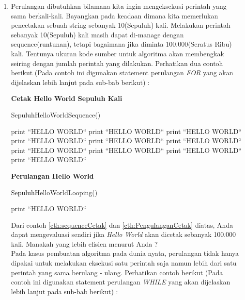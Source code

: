 \begin{enumerate}
	\item Perulangan dibutuhkan bilamana kita ingin mengeksekusi perintah yang sama berkali-kali. Bayangkan pada keadaan dimana kita memerlukan pencetakan sebuah string sebanyak 10(Sepuluh) kali. Melakukan perintah sebanyak 10(Sepuluh) kali masih dapat di-manage dengan sequence(runtunan), tetapi bagaimana jika diminta 100.000(Seratus Ribu) kali. Tentunya ukuran kode sumber untuk algoritma akan membengkak seiring dengan jumlah perintah yang dilakukan. Perhatikan dua contoh berikut (Pada contoh ini digunakan statement perulangan \textit{FOR} yang akan dijelaskan lebih lanjut pada sub-bab berikut) :
	
\begin{contoh}
	\label{cth:sequenceCetak}
	\textbf{Cetak Hello World Sepuluh Kali}
	\begin{algorithm}
	\caption{SepuluhHelloWorldSequence()}
		\begin{algorithmic}[1]
			\STATE print ``HELLO WORLD``
			\STATE print ``HELLO WORLD``
			\STATE print ``HELLO WORLD``
			\STATE print ``HELLO WORLD``
			\STATE print ``HELLO WORLD``
			\STATE print ``HELLO WORLD``
			\STATE print ``HELLO WORLD``
			\STATE print ``HELLO WORLD``
			\STATE print ``HELLO WORLD``
			\STATE print ``HELLO WORLD``
		\end{algorithmic}
	\end{algorithm}
\end{contoh}

\begin{contoh}
	\label{cth:PengulanganCetak}
	\textbf{Perulangan Hello World}
	\begin{algorithm}
	\caption{SepuluhHelloWorldLooping()}
		\begin{algorithmic}[1]
		\FOR{$i=1$ \TO $10$}
			\STATE print ``HELLO WORLD``
		\ENDFOR
		\end{algorithmic}
	\end{algorithm}
\end{contoh}

Dari contoh \ref{cth:sequenceCetak} dan \ref{cth:PengulanganCetak} diatas, Anda dapat mengevaluasi sendiri jika \textit{Hello World} akan dicetak sebanyak 100.000 kali. Manakah yang lebih efisien menurut Anda ? \\
Pada kasus pembuatan algoritma pada dunia nyata, perulangan tidak hanya dipakai untuk melakukan eksekusi satu perintah saja namun lebih dari satu perintah yang sama berulang - ulang. Perhatikan contoh berikut (Pada contoh ini digunakan statement perulangan \textit{WHILE} yang akan dijelaskan lebih lanjut pada sub-bab berikut) : 


\end{enumerate}
